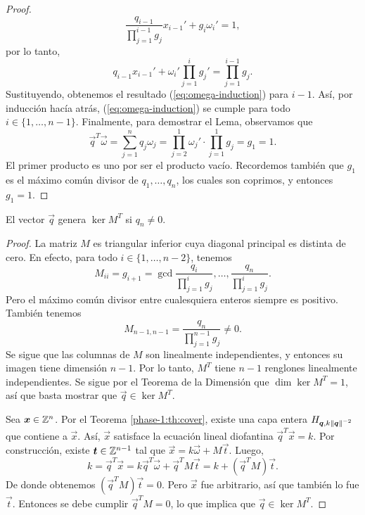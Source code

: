 \begin{proof}
\begin{equation*}
		\frac{q_{i-1}}{\prod_{j=1}^{i-1}g_j}x_{i-1}' +
		g_i \omega_i' = 1,
	\end{equation*}
	por lo tanto,
	\begin{equation*}
		q_{i-1}x_{i-1}' + \omega_i'\prod_{j=1}^{i}g_j' = \prod_{j=1}^{i-1}g_j.
	\end{equation*}
	Sustituyendo, obtenemos el resultado (\ref{eq:omega-induction}) para $i - 1$. Así, por inducción
	hacía atrás, (\ref{eq:omega-induction}) se cumple para todo $i \in \lbrace 1, \ldots, n - 1
	\rbrace$. Finalmente, para demostrar el Lema, observamos que
	\begin{equation*}
		\vec{q}^T\vec{\omega} = \sum_{j=1}^{n}q_j\omega_j = \prod_{j=2}^{1}\omega_j'
		\cdot \prod_{j=1}^{1}g_j = g_1 = 1.
	\end{equation*}
	El primer producto es uno por ser el producto vacío. Recordemos también que $g_1$ es el máximo
	común divisor de $q_1, \ldots, q_n$, los cuales son coprimos, y entonces $g_1 = 1$.
\end{proof}
\begin{lemma}
	\label{lemma:iso2}
	El vector $\vec{q}$ genera $\ker{M^T}$ si $q_n \neq 0$.
\end{lemma}
\begin{proof}
	La matriz $M$ es triangular inferior cuya diagonal principal es distinta de cero. En efecto,
	para todo $i \in \lbrace 1, \ldots, n - 2\rbrace$, tenemos
	\begin{equation*}
		M_{ii} = g_{i + 1} = \gcd{\frac{q_i}{\prod_{j=1}^{i}g_j}, \ldots,
		\frac{q_n}{\prod_{j=1}^{i}g_j}}.
	\end{equation*}
	Pero el máximo común divisor entre cualesquiera enteros siempre es positivo. También tenemos
	\begin{equation*}
		M_{n-1, n-1} = \frac{q_n}{\prod_{j=1}^{n-1}g_j} \neq 0.
	\end{equation*}
	Se sigue que las columnas de $M$ son linealmente
	independientes, y entonces su imagen tiene dimensión $n - 1$. Por lo tanto, $M^T$ tiene $n - 1$
	renglones linealmente independientes. Se sigue por el Teorema de la Dimensión que $\dim
	\ker{M^T} = 1$, así que basta mostrar que $\vec{q} \in \ker{M^T}$.

	Sea $\boldsymbol{x} \in \mathbb{Z}^n$. Por el Teorema \ref{phase-1:th:cover}, existe una capa entera
	$H_{\boldsymbol{q}, k\left\lVert \boldsymbol{q} \right\rVert^{-2}}$ que contiene a $\vec{x}$. Así, $\vec{x}$ satisface la
	ecuación lineal diofantina $\vec{q}^T\vec{x} = k$. Por construcción, existe $\boldsymbol{t} \in
	\mathbb{Z}^{n-1}$ tal que $\vec{x} = k\vec{\omega} + M\vec{t}$. Luego,
	\begin{equation*}
		k = \vec{q}^T\vec{x} = k \vec{q}^T\vec{\omega} + \vec{q}^TM\vec{t} = k +
		(\vec{q}^TM)\vec{t}.
	\end{equation*}
	De donde obtenemos $(\vec{q}^TM)\vec{t} = 0$. Pero $\vec{x}$ fue arbitrario, así que también lo
	fue $\vec{t}$. Entonces se debe cumplir $\vec{q}^TM = 0$, lo que implica que $\vec{q} \in
	\ker{M^T}$.
\end{proof}

